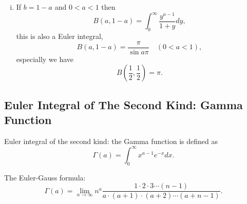 \documentclass{book}
\numberwithin{equation}{section}
\begin{document}
\begin{enumerate}[(i)]
\item If $b=1-a$ and $0<a<1$ then
  \begin{equation}
    B(a,1-a)=\int_0^\infty\frac{y^{a-1}}{1+y}dy,
  \end{equation}
  this is also a Euler integral,
  \begin{equation}
    B(a,1-a)=\frac{\pi}{\sin a\pi}\quad(0<a<1),
  \end{equation}
  especially we have
  \begin{equation}
    B(\frac{1}{2},\frac{1}{2})=\pi.
  \end{equation}
\end{enumerate}

\subsection{Euler Integral of The Second Kind: Gamma Function}
Euler integral of the second kind: the Gamma function is defined as
\begin{equation}
  \Gamma(a)=\int_0^\infty x^{a-1}e^{-x}dx.
\end{equation}

The Euler-Gauss formula:
\begin{equation}
  \Gamma(a)=\lim_{n\to\infty}n^a\frac{1\cdot2\cdot3\cdots(n-1)}
  {a\cdot(a+1)\cdot(a+2)\cdots(a+n-1)}.
\end{equation}
\end{document}
